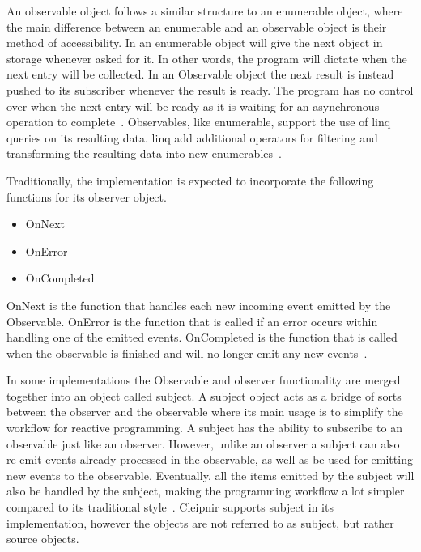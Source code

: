 An observable object follows a similar structure to an enumerable object, where the main difference between an enumerable and an observable object is their method of accessibility. In an enumerable object will give the next object in storage whenever asked for it. In other words, the program will dictate when the next entry will be collected. In an Observable object the next result is instead pushed to its subscriber whenever the result is ready. The program has no control over when the next entry will be ready as it is waiting for an asynchronous operation to complete~\cites{WEB:ReactiveObservable, VIDEO:dotnetsheffReactive, VIDEO:MicroDev}[p.~15]{BOOK:RxLinq}. Observables, like enumerable, support the use of \ac{linq} queries on its resulting data. \ac{linq} add additional operators for filtering and transforming the resulting data into new enumerables~\cites{VIDEO:dotnetsheffReactive}[p.~3-4]{BOOK:RxLinq}[p.~208]{BOOK:DotnetMultithreadCookBook}.

Traditionally, the implementation is expected to incorporate the following functions for its observer object.
\begin{itemize}
	\item{OnNext}
	\item{OnError}
	\item{OnCompleted}
\end{itemize}

OnNext is the function that handles each new incoming event emitted by the Observable. OnError is the function that is called if an error occurs within handling one of the emitted events. OnCompleted is the function that is called when the observable is finished and will no longer emit any new events~\cite{WEB:ReactiveObservable}.

In some implementations the Observable and observer functionality are merged together into an object called subject. A subject object acts as a bridge of sorts between the observer and the observable where its main usage is to simplify the workflow for reactive programming. A subject has the ability to subscribe to an observable just like an observer. However, unlike an observer a subject can also re-emit events already processed in the observable, as well as be used for emitting new events to the observable. Eventually, all the items emitted by the subject will also be handled by the subject, making the programming workflow a lot simpler compared to its traditional style~\cite{WEB:ReactiveSubject}. Cleipnir supports subject in its implementation, however the objects are not referred to as subject, but rather source objects.
\fi

